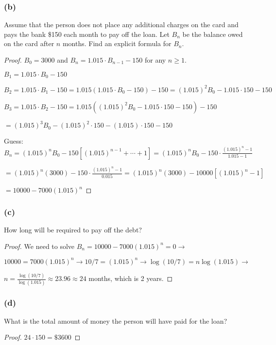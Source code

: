 \documentclass[14pt]{extarticle}
\newcommand{\dps}{\displaystyle}
\begin{document}
\subsubsection{(b)}
Assume that the person does not place any additional charges on the card and pays the bank \$150 each month to pay off the loan. Let $B_n$ be the balance owed on the card after $n$ months. Find an explicit formula for $B_n$.

\begin{proof}
    \(B_0 = 3000\) and \(B_n = 1.015 \cdot B_{n-1} - 150\) for any \(n \geq 1\).

    \(B_1 = 1.015 \cdot B_0 - 150\)

    \(B_2 = 1.015 \cdot B_1 - 150 = 1.015(1.015 \cdot B_0 - 150) - 150 = (1.015)^2 B_0 - 1.015 \cdot 150 - 150\)

    \(B_3 = 1.015 \cdot B_2 - 150 = 1.015((1.015)^2 B_0 - 1.015 \cdot 150 - 150) - 150\)

    \(= (1.015)^3 B_0 - (1.015)^2 \cdot 150 - (1.015) \cdot 150 - 150\)

    Guess: \(B_n = (1.015)^n B_0 - 150[(1.015)^{n-1} + \cdots + 1]
    = \dps (1.015)^n B_0 - 150 \cdot \frac{(1.015)^n - 1}{1.015 - 1}\)

    \( = \dps (1.015)^n (3000) - 150 \cdot \frac{(1.015)^n - 1}{0.015} = (1.015)^n (3000) - 10000[(1.015)^n - 1]\)

    \(= 10000 - 7000 (1.015)^n\)
\end{proof}

\subsubsection{(c)}
How long will be required to pay off the debt?

\begin{proof}
    We need to solve \(B_n = 10000 - 7000 (1.015)^n = 0 \to\)

    \(10000 = 7000(1.015)^n \to 10/7 = (1.015)^n \to \log(10/7) = n \log(1.015) \to\)

    \(\dps n = \frac{\log(10/7)}{\log(1.015)} \approx 23.96 \approx 24\) months, which is 2 years.
\end{proof}

\subsubsection{(d)}
What is the total amount of money the person will have paid for the loan?

\begin{proof}
    \(24 \cdot 150 = \$3600\)
\end{proof}
\end{document}
